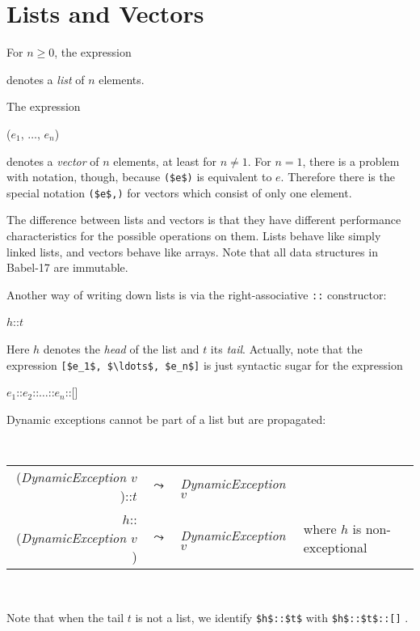 \documentclass[11pt]{amsart}
\newcommand{\metababel}[1] {\textsl{#1}}
\newenvironment{babelcode}[0]{\begin{center}\tt}{\end{center}}
\newcommand{\babelsrc}[1] {\lstinline!#1!}
\begin{document}
\section{Lists and Vectors}
For $n \ge 0$, the expression
\begin{babellisting}
[$e_1$, $\ldots$, $e_n$]
\end{babellisting}
denotes a \emph{list} of $n$ elements. 

The expression
\begin{babellisting}
($e_1$, $\ldots$, $e_n$)
\end{babellisting}
denotes a  \emph{vector} of $n$ elements, at least for $n \neq 1$. 
For $n=1$, there is a problem with notation, though, because \babelsrc{($e$)}  is equivalent to $e$. Therefore there is the special notation \babelsrc{($e$,)} for vectors which consist of only one element.

The difference between lists and vectors is that they have different performance characteristics for the possible operations on them. Lists behave like simply linked lists, and vectors behave like arrays. Note that all data structures in Babel-17 are immutable. 

Another way of writing down lists is via the right-associative \babelsrc{::} constructor:
\begin{babellisting}
$h$::$t$
\end{babellisting}
Here $h$ denotes the \emph{head} of the list and $t$ its \emph{tail}. Actually, note that the expression \babelsrc{[$e_1$, $\ldots$, $e_n$]} is just syntactic sugar for the expression
\begin{babellisting}
$e_1$::$e_2$::$\ldots$::$e_n$::[]
\end{babellisting}
Dynamic exceptions cannot be part of a list but are propagated:
\begin{babelcode}
\begin{tabular}{rcll}
(\metababel{DynamicException $v$})::$t$ & $\leadsto$ & \metababel{DynamicException $v$}&\\
$h$::(\metababel{DynamicException $v$}) & $\leadsto$ & \metababel{DynamicException $v$}& {\rm where $h$ is non-exceptional}\\
\end{tabular}\\
\end{babelcode}
Note that when the tail $t$ is not a list, we identify \babelsrc{$h$::$t$} with  \babelsrc{$h$::$t$::[]} . 
\end{document}
